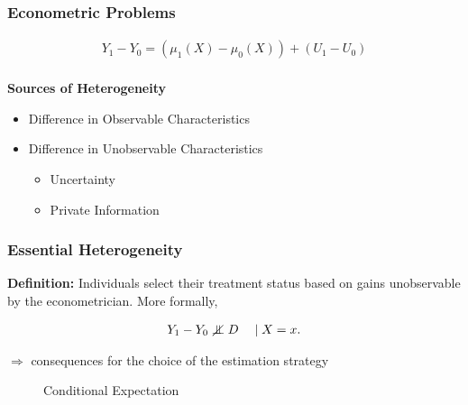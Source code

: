 \begin{frame}
\frametitle{Econometric Problems}

\begin{align*}
Y_1 - Y_0 = (\mu_1(X) - \mu_0(X)) + (U_1 - U_0)\\
\end{align*}

\textbf{Sources of Heterogeneity}
\begin{itemize}
	\item Difference in Observable Characteristics
	\item Difference in Unobservable Characteristics
	\begin{itemize}
		\item  Uncertainty
		\item Private Information
	\end{itemize}
\end{itemize}

\end{frame}


\begin{frame}
\frametitle{Essential Heterogeneity}

\textbf{Definition:} Individuals select their treatment status based on
gains unobservable by the econometrician. More formally,

\begin{align*}
Y_1 - Y_0 \notindep D\quad \mid X = x.
\end{align*}

\(\Rightarrow\) consequences for the choice of the estimation strategy

\end{frame}


\begin{frame}

\begin{figure}[htp]\centering
	\caption{Conditional Expectation}\label{eh-Conditional Expectation}
\end{figure}

\end{frame}



